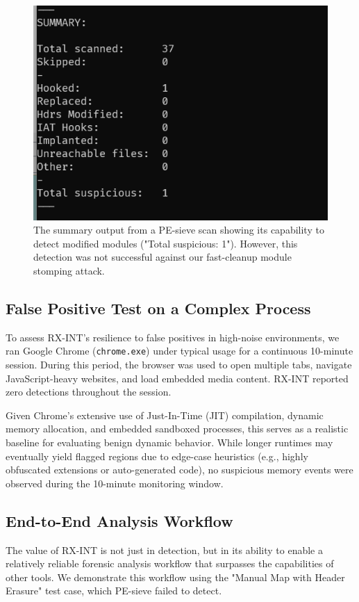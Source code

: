 \documentclass[journal]{IEEEtran}
\begin{document}
\begin{figure}[!t]
\centering
\includegraphics[width=0.7\columnwidth]{figures/pesieve_summary.png}
\caption{The summary output from a PE-sieve scan showing its capability to detect modified modules ("Total suspicious: 1"). However, this detection was not successful against our fast-cleanup module stomping attack.}
\label{fig_pesieve_summary}
\end{figure}

\subsection{False Positive Test on a Complex Process}

To assess RX-INT’s resilience to false positives in high-noise environments, we ran Google Chrome (\texttt{chrome.exe}) under typical usage for a continuous 10-minute session. During this period, the browser was used to open multiple tabs, navigate JavaScript-heavy websites, and load embedded media content. RX-INT reported zero detections throughout the session.

Given Chrome’s extensive use of Just-In-Time (JIT) compilation, dynamic memory allocation, and embedded sandboxed processes, this serves as a realistic baseline for evaluating benign dynamic behavior. While longer runtimes may eventually yield flagged regions due to edge-case heuristics (e.g., highly obfuscated extensions or auto-generated code), no suspicious memory events were observed during the 10-minute monitoring window.


\subsection{End-to-End Analysis Workflow}
The value of RX-INT is not just in detection, but in its ability to enable a relatively reliable forensic analysis workflow that surpasses the capabilities of other tools. We demonstrate this workflow using the "Manual Map with Header Erasure" test case, which PE-sieve failed to detect.
\end{document}
